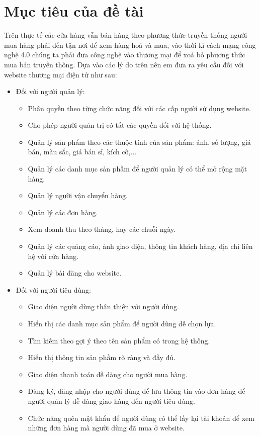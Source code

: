 \section{Mục tiêu của đề tài}
Trên thực tế các cửa hàng vẫn bán hàng theo phương thức truyền thống ngưới mua hàng phải đến tận nơi để xem hàng hoá và mua, vào thời kì cách mạng công nghệ 4.0 chúng ta phải đưa công nghệ vào thương mại để xoá bỏ phương thức mua bán truyền thông. Dựa vào các lý do trên nên em đưa ra yêu cầu đối với website thương mại điện tử như sau:
\begin{itemize}
\item Đối với người quản lý:
\begin{itemize}
\item Phân quyền theo từng chức năng đối với các cấp người sử dụng website.
\item Cho phép người quản trị có tất các quyền đối với hệ thống.
\item Quản lý sản phẩm theo các thuộc tính của sản phẩm: ảnh, số lượng, giá bán, màu sắc, giá bán sỉ, kích cỡ,...
\item Quản lý các danh mục sản phầm để người quản lý có thể mở rộng mặt hàng.
\item Quản lý người vận chuyển hàng.
\item Quản lý các đơn hàng.
\item Xem doanh thu theo tháng, hay các chuỗi ngày.
\item Quản lý các quảng cáo, ảnh giao diện, thông tin khách hàng, địa chỉ liên hệ với cửa hàng.
\item Quản lý bài đăng cho website.
\end{itemize}
\item Đối với người tiêu dùng:
\begin{itemize}
\item Giao diện người dùng thân thiện với người dùng.
\item Hiển thị các danh mục sản phẩm để người dùng dễ chọn lựa.
\item Tìm kiếm theo gợi ý theo tên sản phẩm có trong hệ thống.
\item Hiển thị thông tin sản phầm rõ ràng và đầy đủ.
\item Giao diện thanh toán dễ dàng cho người mua hàng.
\item Đăng ký, đăng nhập cho người dùng để lưu thông tin vào đơn hàng để người quản lý dễ dàng giao hàng đến người tiêu dùng.
\item Chức năng quên mật khẩu để người dùng có thể lấy lại tài khoản để xem những đơn hàng mà người dùng đã mua ở website.
\end{itemize}
\end{itemize}
